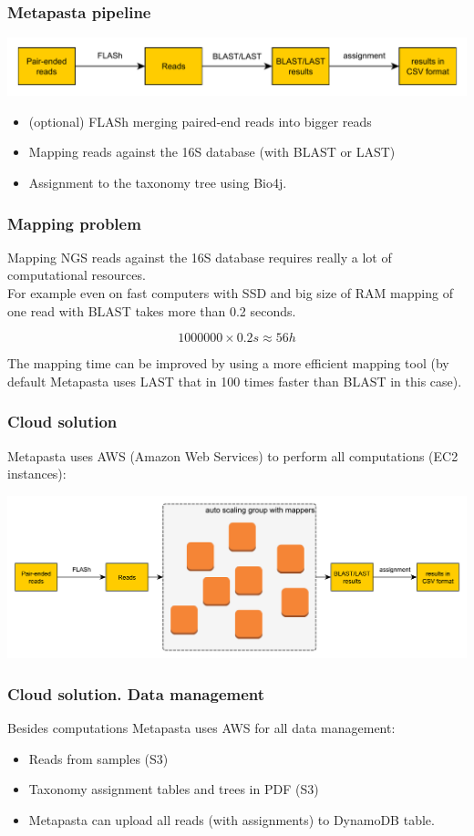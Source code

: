 \documentclass{beamer}
\begin{document}
\begin{frame}
\frametitle{Metapasta pipeline}
\includegraphics[width=\textwidth]{general.pdf}

\begin{itemize}
  \item (optional) FLASh merging paired-end reads into bigger reads
  \item Mapping reads against the 16S database (with BLAST or LAST)
  \item Assignment to the taxonomy tree using Bio4j.
\end{itemize}
\end{frame}

\begin{frame}
\frametitle{Mapping problem}
Mapping NGS reads against the 16S database requires really a lot of computational resources.
\\
For example even on fast computers with SSD and big size of RAM mapping of one read with BLAST takes more than 0.2 seconds.

$$ 1 000 000 \times 0.2 s \approx 56 h $$

The mapping time can be improved by using a more efficient mapping tool (by default Metapasta uses LAST that in 100 times faster than BLAST in this case).
\end{frame}

\begin{frame}
\frametitle{Cloud solution}

Metapasta uses AWS (Amazon Web Services) to perform all computations (EC2 instances):

\includegraphics[width=\textwidth]{pipeline_dist.pdf}
\end{frame}



\begin{frame}
\frametitle{Cloud solution. Data management}
Besides computations Metapasta uses AWS for all data management:
\begin{itemize}
  \item Reads from samples (S3)
  \item Taxonomy assignment tables and trees in PDF (S3)
  \item Metapasta can upload all reads (with assignments) to DynamoDB table.
\end{itemize}
\end{frame}
\end{document}
